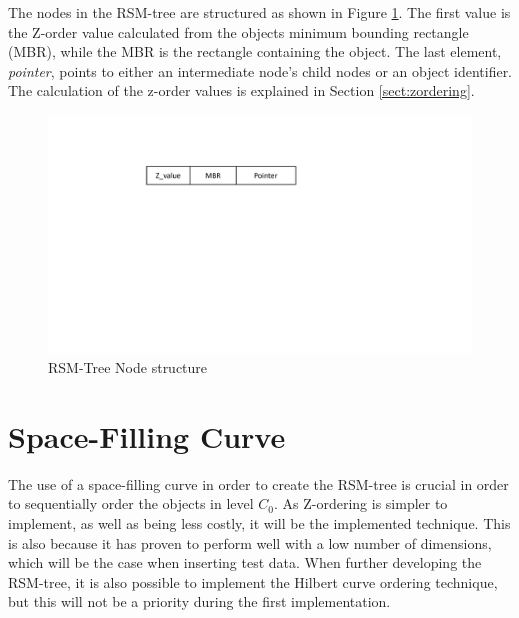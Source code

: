 \noindent
The nodes in the RSM-tree are structured as shown in Figure \ref{fig:nodeRSM}. The first value is the Z-order value calculated from the objects minimum bounding rectangle (MBR), while the MBR is the rectangle containing the object. The last element, \emph{pointer}, points to either an intermediate node's child nodes or an object identifier. The calculation of the z-order values is explained in Section \ref{sect:zordering}. 

\begin{figure}[ht]
    \centering
    \includegraphics[scale=0.5]{figures/node_RSM.pdf}
    \caption{RSM-Tree Node structure}
    \label{fig:nodeRSM}
\end{figure}

\section{Space-Filling Curve}
\label{sect:ordering}
The use of a space-filling curve in order to create the RSM-tree is crucial in order to sequentially order the objects in level $C_0$. As Z-ordering is simpler to implement, as well as being less costly, it will be the implemented technique. This is also because it has proven to perform well with a low number of dimensions\cite{IrregularSpace}, which will be the case when inserting test data. When further developing the RSM-tree, it is also possible to implement the Hilbert curve ordering technique, but this will not be a priority during the first implementation. 

